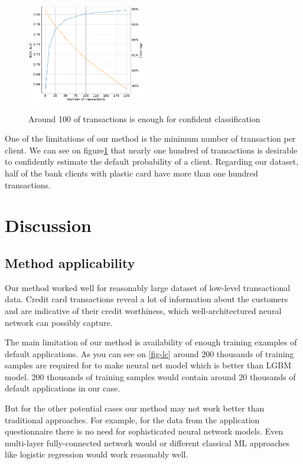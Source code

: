 \documentclass[sigconf]{acmart}
\begin{document}
\begin{figure}[ht]
  \caption{Around 100 of transactions is enough for confident classification}
  \includegraphics[width=0.46\textwidth]{information-vs-accuracy.png}
  \label{fig-tc}
\end{figure}

One of the limitations of our method is the minimum number of transaction per client. We can see on figure\ref{fig-tc} that nearly one hundred of transactions is desirable to confidently estimate the default probability of a client. Regarding our dataset, half of the bank clients with plastic card have more than one hundred transactions.

\section{Discussion}

\subsection{Method applicability}

Our method worked well for reasonably large dataset of low-level transactional data. Credit card transactions reveal a lot of information about the customers and are indicative of their credit worthiness, which well-architectured neural network can possibly capture.

The main limitation of our method is availability of enough training examples of default applications. As you can see on \ref{fig-lc} around 200 thousands of training samples are required for to make neural net model which is better than LGBM model. 200 thousands of training samples would contain around 20 thousands of default applications in our case.

But for the other potential cases our method may not work better than traditional approaches. For example, for the data from the application questionnaire there is no need for sophisticated neural network models. Even multi-layer fully-connected network would or different classical ML approaches like logistic regression would work reasonably well.
\end{document}
